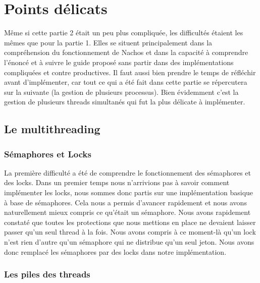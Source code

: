 \documentclass[10pt]{article}
\begin{document}
\newpage
\section {Points délicats}

Même si cette partie 2 était un peu plus compliquée, les difficultés étaient les mêmes
que pour la partie 1. Elles se situent principalement dans la compréhension du fonctionnement
de Nachos et dans la capacité à comprendre l'énoncé et à suivre le guide proposé sans
partir dans des implémentations compliquées et contre productives. Il faut aussi
bien prendre le temps de réfléchir avant d'implémenter, car tout ce qui a été fait dans
cette partie se répercutera sur la suivante (la gestion de plusieurs processus).
\newline
Bien évidemment c'est la gestion de plusieurs threads simultanés qui fut la plus délicate
à implémenter.

\subsection{Le multithreading}
\subsubsection{Sémaphores et Locks}
La première difficulté a été de comprendre le fonctionnement des sémaphores et des locks.
Dans un premier temps nous n'arrivions pas à savoir comment implémenter les locks, nous sommes
donc partis sur une implémentation basique à base de sémaphores. Cela nous a permis d'avancer
rapidement et nous avons naturellement mieux compris ce qu'était un sémaphore.
Nous avons rapidement constaté que toutes les protections que nous mettions en place ne
devaient laisser passer qu'un seul thread à la fois. Nous avons compris à ce moment-là qu'un
lock n'est rien d'autre qu'un sémaphore qui ne distribue qu'un seul jeton.
Nous avons donc remplacé les sémaphores par des locks dans notre implémentation.

\subsubsection{Les piles des threads}
\end{document}
